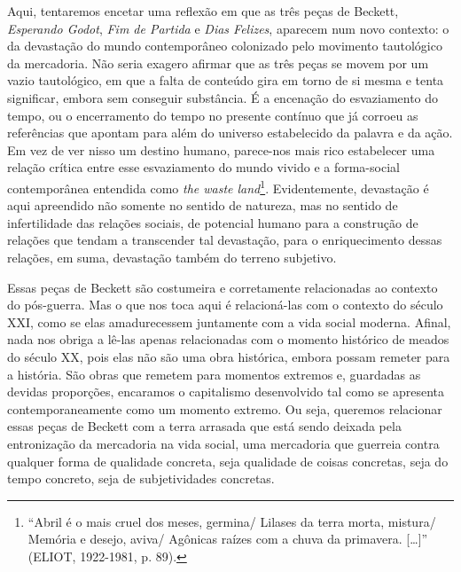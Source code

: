 Aqui, tentaremos encetar uma reflexão em que as três peças de Beckett,
\emph{Esperando Godot}, \emph{Fim de Partida} e \emph{Dias Felizes},
aparecem num novo contexto: o da devastação do mundo contemporâneo
colonizado pelo movimento tautológico da mercadoria. Não seria exagero
afirmar que as três peças se movem por um vazio tautológico, em que a
falta de conteúdo gira em torno de si mesma e tenta significar, embora
sem conseguir substância. É a encenação do esvaziamento do tempo, ou o
encerramento do tempo no presente contínuo que já corroeu as referências
que apontam para além do universo estabelecido da palavra e da ação. Em
vez de ver nisso um destino humano, parece-nos mais rico estabelecer uma
relação crítica entre esse esvaziamento do mundo vivido e a forma-social
contemporânea entendida como \emph{the waste land}\footnote{``Abril é o
  mais cruel dos meses, germina/ Lilases da terra morta, mistura/
  Memória e desejo, aviva/ Agônicas raízes com a chuva da primavera.
  {[}\ldots{}{]}'' (ELIOT, 1922-1981, p. 89).}. Evidentemente,
devastação é aqui apreendido não somente no sentido de natureza, mas no
sentido de infertilidade das relações sociais, de potencial humano para
a construção de relações que tendam a transcender tal devastação, para o
enriquecimento dessas relações, em suma, devastação também do terreno
subjetivo.

Essas peças de Beckett são costumeira e corretamente relacionadas ao
contexto do pós-guerra. Mas o que nos toca aqui é relacioná-las com o
contexto do século XXI, como se elas amadurecessem juntamente com a vida
social moderna. Afinal, nada nos obriga a lê-las apenas relacionadas com
o momento histórico de meados do século XX, pois elas não são uma obra
histórica, embora possam remeter para a história. São obras que remetem
para momentos extremos e, guardadas as devidas proporções, encaramos o
capitalismo desenvolvido tal como se apresenta contemporaneamente como
um momento extremo. Ou seja, queremos relacionar essas peças de Beckett
com a terra arrasada que está sendo deixada pela entronização da
mercadoria na vida social, uma mercadoria que guerreia contra qualquer
forma de qualidade concreta, seja qualidade de coisas concretas, seja do
tempo concreto, seja de subjetividades concretas.

